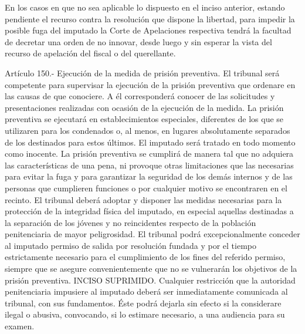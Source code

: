     En los casos en que no sea aplicable lo dispuesto en el inciso anterior, estando pendiente el recurso contra la resolución que dispone la libertad, para impedir la posible fuga del imputado la Corte de Apelaciones respectiva tendrá la facultad de decretar una orden de no innovar, desde luego y sin esperar la vista del recurso de apelación del fiscal o del querellante.







    Artículo 150.- Ejecución de la medida de prisión preventiva. El tribunal será competente para supervisar la ejecución de la prisión preventiva que ordenare en las causas de que conociere. A él corresponderá conocer de las solicitudes y presentaciones realizadas con ocasión de la ejecución de la medida.
    La prisión preventiva se ejecutará en establecimientos especiales, diferentes de los que se utilizaren para los condenados o, al menos, en lugares absolutamente separados de los destinados para estos últimos.
    El imputado será tratado en todo momento como inocente. La prisión preventiva se cumplirá de manera tal que no adquiera las características de una pena, ni provoque otras limitaciones que las necesarias para evitar la fuga y para garantizar la seguridad de los demás internos y de las personas que cumplieren funciones o por cualquier motivo se encontraren en el recinto.
    El tribunal deberá adoptar y disponer las medidas necesarias para la protección de la integridad física del imputado, en especial aquellas destinadas a la separación de los jóvenes y no reincidentes respecto de la población penitenciaria de mayor peligrosidad.
    El tribunal podrá excepcionalmente conceder al imputado permiso de salida por resolución fundada y por el tiempo estrictamente necesario para el cumplimiento de los fines del referido permiso, siempre que se asegure convenientemente que no se vulnerarán los objetivos de la prisión preventiva.
    INCISO SUPRIMIDO.
    Cualquier restricción que la autoridad penitenciaria impusiere al imputado deberá ser inmediatamente comunicada al tribunal, con sus fundamentos. Éste podrá dejarla sin efecto si la considerare ilegal o abusiva, convocando, si lo estimare necesario, a una audiencia para su examen.




